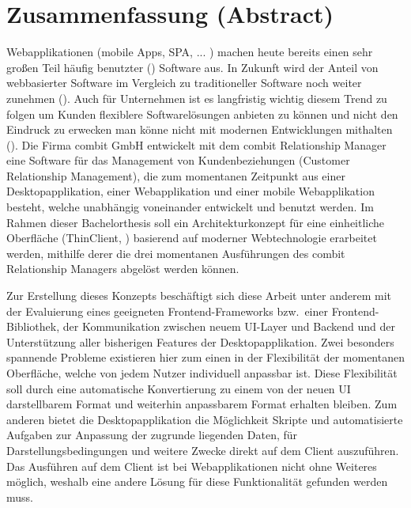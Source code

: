 \chapter{Zusammenfassung (Abstract)}

Webapplikationen (mobile Apps, SPA, ...  ) machen heute bereits einen sehr großen Teil häufig benutzter () Software aus.
In Zukunft wird der Anteil von webbasierter Software im Vergleich zu traditioneller Software noch weiter zunehmen ().
Auch für Unternehmen ist es langfristig wichtig diesem Trend zu folgen um Kunden flexiblere Softwarelösungen anbieten zu können und nicht den Eindruck zu erwecken man könne nicht mit modernen Entwicklungen mithalten ().
Die Firma combit GmbH entwickelt mit dem combit Relationship Manager eine Software für das Management von Kundenbeziehungen (Customer Relationship Management), die zum momentanen Zeitpunkt aus einer Desktopapplikation, einer Webapplikation und einer mobile Webapplikation besteht, welche unabhängig voneinander entwickelt und benutzt werden.
Im Rahmen dieser Bachelorthesis soll ein Architekturkonzept für eine einheitliche Oberfläche (ThinClient, ) basierend auf moderner Webtechnologie erarbeitet werden, mithilfe derer die drei momentanen Ausführungen des combit Relationship Managers abgelöst werden können.

Zur Erstellung dieses Konzepts beschäftigt sich diese Arbeit unter anderem mit der Evaluierung eines geeigneten Frontend-Frameworks bzw.\ einer Frontend-Bibliothek, der Kommunikation zwischen neuem UI-Layer und Backend und der Unterstützung aller bisherigen Features der Desktopapplikation.
Zwei besonders spannende Probleme existieren hier zum einen in der Flexibilität der momentanen Oberfläche, welche von jedem Nutzer individuell anpassbar ist. Diese Flexibilität soll durch eine automatische Konvertierung zu einem von der neuen UI darstellbarem Format und weiterhin anpassbarem Format erhalten bleiben. 
Zum anderen bietet die Desktopapplikation die Möglichkeit Skripte und automatisierte Aufgaben zur Anpassung der zugrunde liegenden Daten, für Darstellungsbedingungen und weitere Zwecke direkt auf dem Client auszuführen. Das Ausführen auf dem Client ist bei Webapplikationen nicht ohne Weiteres möglich, weshalb eine andere Lösung für diese Funktionalität gefunden werden muss.
